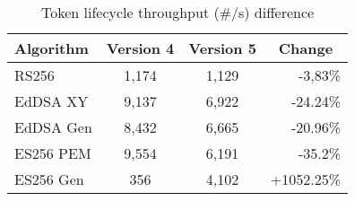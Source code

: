 \begin{table}[h]
    \centering
    \begin{tabular}{lccr}
        \toprule
        Algorithm & Version 4 & Version 5 & \multicolumn{1}{c}{Change} \\
        \midrule
        RS256 & 1,174 & 1,129 & \textcolor{darkerred}{-3,83\%} \\
        EdDSA XY & 9,137 & 6,922 & \textcolor{darkerred}{-24.24\%} \\
        EdDSA Gen & 8,432 & 6,665 & \textcolor{darkerred}{-20.96\%} \\
        ES256 PEM & 9,554 & 6,191 & \textcolor{darkerred}{-35.2\%} \\
        ES256 Gen & 356 & 4,102 & \textcolor{darkergreen}{+1052.25\%} \\
        \bottomrule
    \end{tabular}
    \caption{Token lifecycle throughput (\#/s) difference}
\end{table} 

